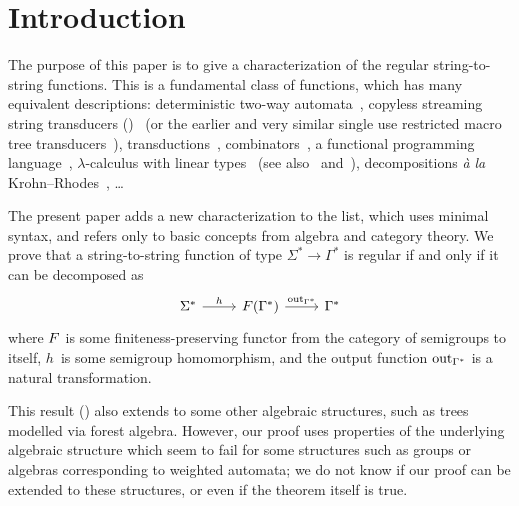 \section{Introduction}
\label{sec:intro}

The purpose of this paper is to give a characterization of the regular string-to-string functions. This is a fundamental class of functions, which has many equivalent descriptions: deterministic two-way automata~\cite[Note~4]{shepherdson1959reduction}, copyless streaming string transducers (\sst)~\cite[Section~3]{alurExpressivenessStreamingString2010} (or the earlier and very similar single use restricted macro tree transducers~\cite[Section~5]{MacroMSO}), \mso transductions~\cite[Theorem~13]{engelfrietMSODefinableString2001}, combinators~\cite[Section~2]{alur2014regular}, a functional programming language~\cite[Section~6]{bojanczykRegularFirstOrderList2018}, $\lambda$-calculus with linear types~\cite[Theorem~3]{LambdaTransducer} (see also~\cite[Claim~6.2]{IATLC} and~\cite[Theorem~1.2.3]{titoPhD}), decompositions \textit{à la} Krohn--Rhodes~\cite[Theorem~18, item~4]{bojanczykstefanski2020}, \ldots

The present paper adds a new characterization to the list, which uses minimal syntax, and refers only to basic concepts from algebra and category theory. We prove that a string-to-string function of type $\Sigma^* \to \Gamma^*$ is regular
if and only if it can be decomposed as 
\[
\begin{tikzcd}
    \Sigma^* 
    \ar[r,"h"]
    & 
    \functor(\Gamma^*)
    \ar[r,"\outfun_{\Gamma^*}"]
    &
    \Gamma^*
\end{tikzcd}
\]
where $\functor$ is some finiteness-preserving functor from the category of semigroups to itself, $h$~is some semigroup homomorphism, and the output function $\mathrm{out}_{\Gamma^*}$ is a natural transformation.

This result () also extends to some other algebraic structures, such as trees modelled via forest algebra. However, our proof uses properties of the underlying algebraic structure which seem to fail for some structures such as groups or algebras corresponding to weighted automata; we do not know if our proof can be extended to  these structures, or even if the theorem itself is true.

